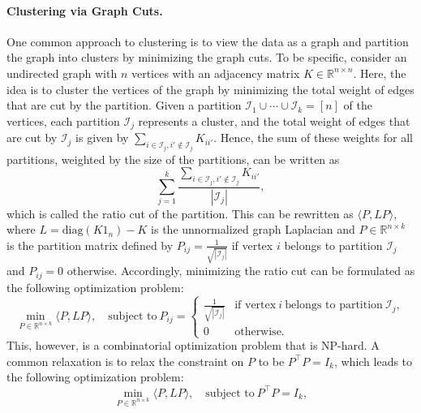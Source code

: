 \documentclass{article}
\theoremstyle{definition}
\newcommand{\cI}{\mathcal{I}}
\newcommand{\R}{\mathbb{R}}
\begin{document}
\paragraph{Clustering via Graph Cuts.} 
One common approach to clustering is to view the data as a graph and partition the graph into clusters by minimizing the graph cuts. To be specific, consider an undirected graph with $n$ vertices with an adjacency matrix $K \in \R^{n \times n}$. Here, the idea is to cluster the vertices of the graph by minimizing the total weight of edges that are cut by the partition. Given a partition $\cI_1 \cup \cdots \cup \cI_k = [n]$ of the vertices, each partition $\cI_j$ represents a cluster, and the total weight of edges that are cut by $\cI_j$ is given by $\sum_{i \in \cI_j, i' \notin \cI_j} K_{i i'}$. Hence, the sum of these weights for all partitions, weighted by the size of the partitions, can be written as
\begin{equation*}
    \sum_{j = 1}^{k} \frac{\sum_{i \in \cI_j, i' \notin \cI_j} K_{i i'}}{|\cI_j|},
\end{equation*}
which is called the ratio cut of the partition. This can be rewritten as $\langle P, L P \rangle$, where $L = \mathrm{diag}(K 1_n) - K$ is the unnormalized graph Laplacian and $P \in \R^{n \times k}$ is the partition matrix defined by $P_{i j} = \frac{1}{\sqrt{|\cI_j|}}$ if vertex $i$ belongs to partition $\cI_j$ and $P_{i j} = 0$ otherwise. Accordingly, minimizing the ratio cut can be formulated as the following optimization problem:
\begin{equation*}
    \min_{P \in \R^{n \times k}} \langle P, L P  \rangle, \quad \text{subject to} ~ P_{i j} 
    = 
    \begin{cases}
        \frac{1}{\sqrt{|\cI_j|}} & \text{if vertex} ~ i ~ \text{belongs to partition} ~ \cI_j, \\
        0 & \text{otherwise}.
    \end{cases}
\end{equation*}
This, however, is a combinatorial optimization problem that is NP-hard. A common relaxation is to relax the constraint on $P$ to be $P^\top P = I_k$, which leads to the following optimization problem:
\begin{equation*}
    \min_{P \in \R^{n \times k}} \langle P, L P \rangle, \quad \text{subject to} ~ P^\top P = I_k,
\end{equation*}
\end{document}
